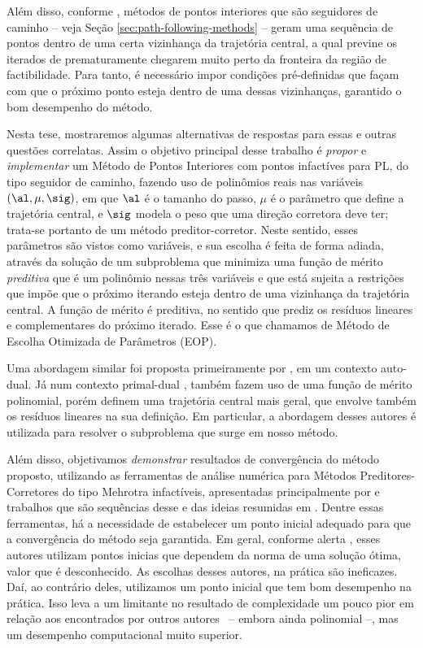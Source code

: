 Além disso, conforme \textcite{Hung:1996br}, métodos de pontos interiores que são seguidores de caminho  -- veja Seção \ref{sec:path-following-methods} --  geram uma sequência de pontos dentro de uma certa vizinhança da  trajetória central, a qual previne os iterados de prematuramente chegarem muito perto da fronteira da região de factibilidade. Para tanto, é necessário impor condições pré-definidas que façam com que o próximo ponto esteja dentro de uma dessas vizinhanças, garantido  o bom desempenho do método. 




Nesta tese, mostraremos algumas alternativas de respostas para  essas e outras questões correlatas. Assim o objetivo principal desse trabalho é \emph{propor} e \emph{implementar} um Método de Pontos Interiores com pontos infactíves para \ac{PL}, do tipo seguidor de caminho, fazendo  uso de polinômios reais nas variáveis $(\al,\mu,\sig)$, em que $\al$ é o tamanho do passo, $\mu$ é o parâmetro que define a trajetória central, e $\sig$ modela o peso que uma direção corretora deve ter; trata-se portanto de um método preditor-corretor. Neste sentido, esses parâmetros são vistos como variáveis, e sua escolha é feita de forma adiada, através da solução de um subproblema que minimiza uma função de mérito \emph{preditiva} que é um polinômio nessas três variáveis e que está sujeita a restrições que impõe que o próximo iterando esteja dentro de uma vizinhança da trajetória central. A função de mérito é preditiva, no sentido que prediz os resíduos lineares e complementares do próximo iterado. Esse é  o que chamamos de Método de Escolha Otimizada de Parâmetros (EOP).


Uma abordagem similar foi proposta primeiramente por \textcite{VillasBoas:2003tg}, em um contexto auto-dual. Já num contexto primal-dual \textcite{VillasBoas:2012ur,VillasBoas2013:wn}, também fazem uso de uma função de mérito polinomial, porém definem uma trajetória central mais geral, que envolve também os resíduos lineares na sua definição.  Em particular, a abordagem desses autores é utilizada para resolver o subproblema que surge em nosso método.

Além disso, objetivamos \emph{demonstrar} resultados de convergência do método proposto, utilizando as ferramentas de análise numérica para Métodos Preditores-Corretores do tipo Mehrotra infactíveis, apresentadas principalmente por \textcite{Zhang:2006ic} e trabalhos que são sequências desse e das ideias resumidas em \textcite[cap. 7]{Wright:Primal-dual-interior-point:1997h}. Dentre essas ferramentas, há a necessidade de estabelecer um ponto inicial adequado para que a convergência do método seja garantida. Em geral, conforme alerta \textcite[p. 112]{Wright:Primal-dual-interior-point:1997h}, esses autores utilizam pontos inicias que dependem da norma de uma solução ótima, valor que é desconhecido. As escolhas desses autores, na prática são ineficazes. 
Daí, ao contrário deles, utilizamos um ponto inicial que tem bom desempenho na prática. Isso leva a um  limitante no resultado de complexidade um pouco pior  em relação aos encontrados por outros autores~\cite{Zhang:1995fu,Zhang:2006ic,Wright:1993je,Wright:1996kj} -- embora ainda polinomial --, mas um desempenho computacional muito superior. 



